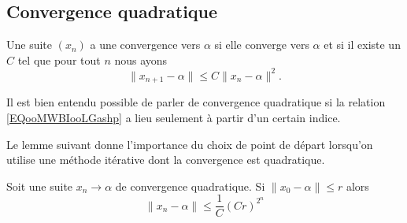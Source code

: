 \subsection{Convergence quadratique}

\begin{definition}      \label{DEFooSUTRooAcXXjj}
    Une suite \( (x_n)\) a une convergence  vers \( \alpha\) si elle converge vers \( \alpha\) et si il existe un \( C\) tel que pour tout \( n\) nous ayons
    \begin{equation}    \label{EQooMWBIooLGashp}
        \| x_{n+1}-\alpha \|\leq C\| x_n-\alpha \|^2.
    \end{equation}
\end{definition}
Il est bien entendu possible de parler de convergence quadratique si la relation \eqref{EQooMWBIooLGashp} a lieu seulement à partir d'un certain indice.

Le lemme suivant donne l'importance du choix de point de départ lorsqu'on utilise une méthode itérative dont la convergence est quadratique.
\begin{lemma}       \label{LEMooLQMAooICcmrn}
    Soit une suite \( x_n\to \alpha\) de convergence quadratique. Si \( \| x_0-\alpha \|\leq r\) alors
    \begin{equation}        \label{EQooVYRIooTxetPn}
        \| x_n-\alpha \|\leq \frac{1}{ C }(Cr)^{2^n}
    \end{equation}
\end{lemma}

